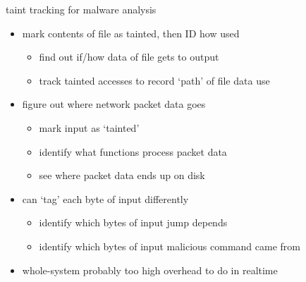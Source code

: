 \begin{frame}{taint tracking for malware analysis}
\begin{itemize}
\item mark contents of file as tainted, then ID how used
    \begin{itemize}
    \item find out if/how data of file gets to output
    \item track tainted accesses to record `path' of file data use
    \end{itemize}
\item figure out where network packet data goes
    \begin{itemize}
    \item mark input as `tainted'
    \item identify what functions process packet data
    \item see where packet data ends up on disk
    \end{itemize}
\vspace{.5cm}
\item can `tag' each byte of input differently
    \begin{itemize}
    \item identify which bytes of input jump depends
    \item identify which bytes of input malicious command came from
    \end{itemize}
\item whole-system probably too high overhead to do in realtime
\end{itemize}
\end{frame}
